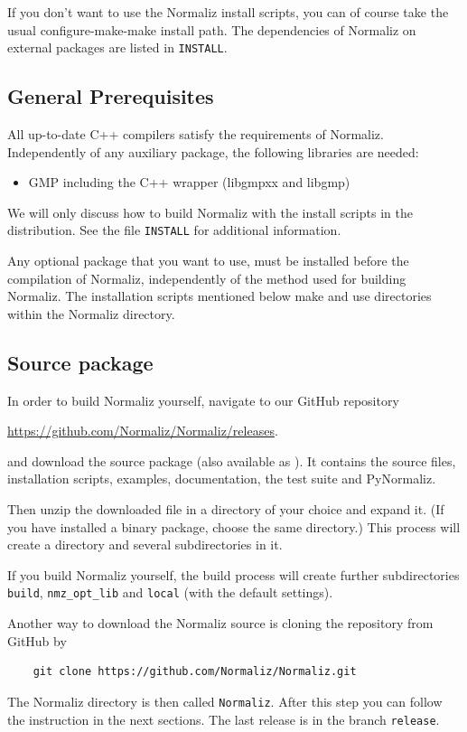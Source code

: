 If you don't want to use the Normaliz install scripts, you can of course take the usual configure-make-make install path. The dependencies of Normaliz on external packages are listed in \verb|INSTALL|.

\subsection{General Prerequisites}

All up-to-date C++ compilers satisfy the requirements of Normaliz. Independently of any auxiliary package,  the following libraries are needed:
\begin{itemize}
	\item GMP including the C++ wrapper (libgmpxx and libgmp)
\end{itemize}

We will only discuss how to build Normaliz with the install scripts in the distribution. See the file \verb|INSTALL| for additional information.

Any optional package that you want to use, must be installed before the compilation of Normaliz, independently of the method used for building Normaliz. The installation scripts mentioned below make and use directories within the Normaliz directory.

\subsection{Source package}
In order to build Normaliz yourself, navigate to our GitHub repository
\begin{center}
	\url{https://github.com/Normaliz/Normaliz/releases}.
\end{center}
and download the
source package  (also available as ). It contains the source files, installation scripts, examples, documentation, the test suite and PyNormaliz.

Then unzip the downloaded file in a directory of your choice and expand it. (If you have installed a binary package, choose the same directory.)
This process will create a directory \ttt{\NmzDir} and several subdirectories in it.

If you build Normaliz yourself, the build process will create further subdirectories \verb|build|, \verb|nmz_opt_lib| and \verb|local| (with the default settings).

Another way to download the Normaliz source is cloning the repository from GitHub by
\begin{Verbatim}
	git clone https://github.com/Normaliz/Normaliz.git
\end{Verbatim}
The Normaliz directory is then called \verb|Normaliz|.
After this step you can follow the instruction in the next sections. The last release is in the branch \verb*|release|.

